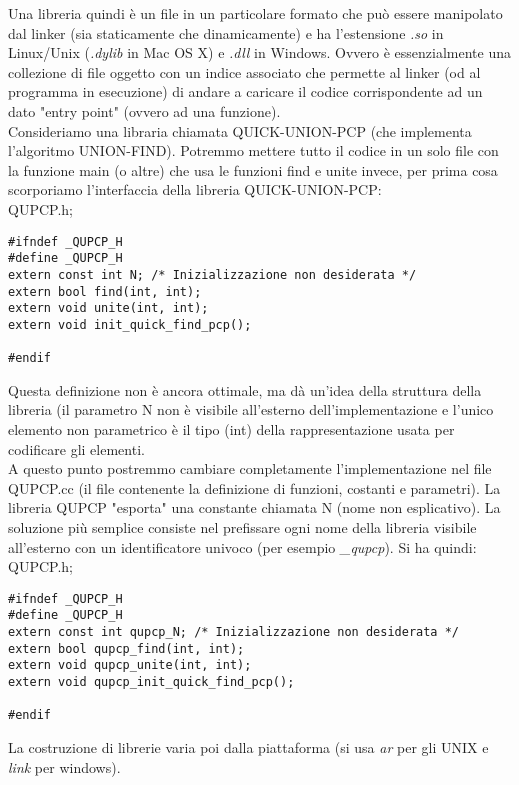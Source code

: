 \documentclass[a4paper,12pt, oneside]{book}
\begin{document}
Una libreria quindi è un file in un particolare formato che può essere manipolato dal
linker (sia staticamente che dinamicamente) e ha l'estensione \textit{.so} in Linux/Unix (\textit{.dylib} in Mac OS X) e \textit{.dll} in Windows. Ovvero è essenzialmente una collezione di file oggetto con
un indice associato che permette al linker (od al programma in esecuzione) di andare a caricare il codice corrispondente ad un dato "entry point" (ovvero ad una funzione).\\
Consideriamo una libraria chiamata QUICK-UNION-PCP (che
implementa l'algoritmo UNION-FIND). Potremmo mettere tutto il codice in un solo file con la funzione main (o
altre) che usa le funzioni find e unite invece, per prima cosa scorporiamo l'interfaccia della libreria
QUICK-UNION-PCP:\\
QUPCP.h;
\begin{verbatim}
#ifndef _QUPCP_H
#define _QUPCP_H
extern const int N; /* Inizializzazione non desiderata */
extern bool find(int, int);
extern void unite(int, int);
extern void init_quick_find_pcp();

#endif
\end{verbatim}
Questa definizione non è ancora ottimale, ma dà un'idea della
struttura della libreria (il parametro N non è visibile all'esterno dell'implementazione e l'unico elemento non parametrico è il tipo (int) della
rappresentazione usata per codificare gli elementi.\\
A questo punto postremmo cambiare completamente
l'implementazione nel file QUPCP.cc (il file contenente la
definizione di funzioni, costanti e parametri). La libreria QUPCP "esporta" una constante chiamata N (nome non esplicativo). La soluzione più semplice consiste nel prefissare ogni nome
della libreria visibile all'esterno con un identificatore univoco (per esempio \textit{\_qupcp}). Si ha quindi:
QUPCP.h;
\begin{verbatim}
#ifndef _QUPCP_H
#define _QUPCP_H
extern const int qupcp_N; /* Inizializzazione non desiderata */
extern bool qupcp_find(int, int);
extern void qupcp_unite(int, int);
extern void qupcp_init_quick_find_pcp();

#endif
\end{verbatim}
La costruzione di librerie varia poi dalla piattaforma (si usa \textit{ar} per gli UNIX e \textit{link} per windows).
\end{document}
